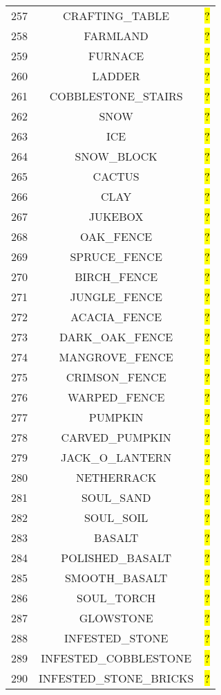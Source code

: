 \documentclass[11pt]{article}
\newcommand\myworries[1]{\sethlcolor{red}\hl{#1}}
\begin{document}
\begin{longtable}{ |c|c|c| }
	257 & CRAFTING\_TABLE & \myworries{?} \\
	258 & FARMLAND & \myworries{?} \\
	259 & FURNACE & \myworries{?} \\
	260 & LADDER & \myworries{?} \\
	261 & COBBLESTONE\_STAIRS & \myworries{?} \\
	262 & SNOW & \myworries{?} \\
	263 & ICE & \myworries{?} \\
	264 & SNOW\_BLOCK & \myworries{?} \\
	265 & CACTUS & \myworries{?} \\
	266 & CLAY & \myworries{?} \\
	267 & JUKEBOX & \myworries{?} \\
	268 & OAK\_FENCE & \myworries{?} \\
	269 & SPRUCE\_FENCE & \myworries{?} \\
	270 & BIRCH\_FENCE & \myworries{?} \\
	271 & JUNGLE\_FENCE & \myworries{?} \\
	272 & ACACIA\_FENCE & \myworries{?} \\
	273 & DARK\_OAK\_FENCE & \myworries{?} \\
	274 & MANGROVE\_FENCE & \myworries{?} \\
	275 & CRIMSON\_FENCE & \myworries{?} \\
	276 & WARPED\_FENCE & \myworries{?} \\
	277 & PUMPKIN & \myworries{?} \\
	278 & CARVED\_PUMPKIN & \myworries{?} \\
	279 & JACK\_O\_LANTERN & \myworries{?} \\
	280 & NETHERRACK & \myworries{?} \\
	281 & SOUL\_SAND & \myworries{?} \\
	282 & SOUL\_SOIL & \myworries{?} \\
	283 & BASALT & \myworries{?} \\
	284 & POLISHED\_BASALT & \myworries{?} \\
	285 & SMOOTH\_BASALT & \myworries{?} \\
	286 & SOUL\_TORCH & \myworries{?} \\
	287 & GLOWSTONE & \myworries{?} \\
	288 & INFESTED\_STONE & \myworries{?} \\
	289 & INFESTED\_COBBLESTONE & \myworries{?} \\
	290 & INFESTED\_STONE\_BRICKS & \myworries{?} \\

\end{longtable}
\end{document}
